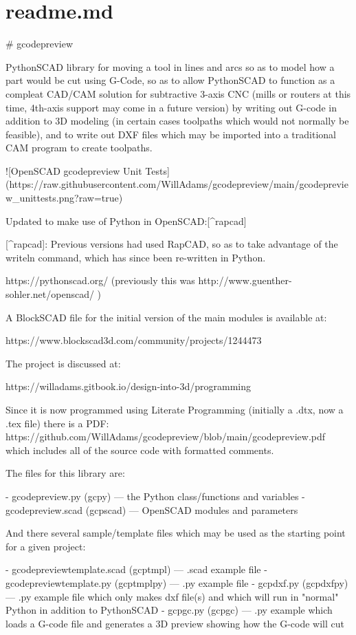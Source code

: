 \documentclass{ltxdoc}
\begin{document}
\clearpage
\section{readme.md}

\begin{readme}
# gcodepreview

PythonSCAD library for moving a tool in lines and arcs so as to model how a part would be cut using G-Code, so as to allow PythonSCAD to function as a compleat CAD/CAM solution for subtractive 3-axis CNC (mills or routers at this time, 4th-axis support may come in a future version) by writing out G-code in addition to 3D modeling (in certain cases toolpaths which would not normally be feasible), and to write out DXF files which may be imported into a traditional CAM program to create toolpaths. 

![OpenSCAD gcodepreview Unit Tests](https://raw.githubusercontent.com/WillAdams/gcodepreview/main/gcodepreview_unittests.png?raw=true)

Updated to make use of Python in OpenSCAD:[^rapcad]

[^rapcad]: Previous versions had used RapCAD, so as to take advantage of the writeln command, which has since been re-written in Python.

https://pythonscad.org/ (previously this was http://www.guenther-sohler.net/openscad/ )

A BlockSCAD file for the initial version of the 
main modules is available at:

https://www.blockscad3d.com/community/projects/1244473

The project is discussed at:

https://willadams.gitbook.io/design-into-3d/programming

Since it is now programmed using Literate Programming (initially a .dtx, now a .tex file) there is a PDF: https://github.com/WillAdams/gcodepreview/blob/main/gcodepreview.pdf which includes all of the source code with formatted comments.

The files for this library are:

 - gcodepreview.py (gcpy) --- the Python class/functions and variables
 - gcodepreview.scad (gcpscad) --- OpenSCAD modules and parameters

And there several sample/template files which may be used as the starting point for a given project:

 - gcodepreviewtemplate.scad (gcptmpl) --- .scad example file
 - gcodepreviewtemplate.py (gcptmplpy) --- .py example file 
 - gcpdxf.py (gcpdxfpy) --- .py example file which only makes dxf file(s) and which will run in "normal" Python in addition to PythonSCAD
 - gcpgc.py (gcpgc) --- .py example which loads a G-code file and generates a 3D preview showing how the G-code will cut


\end{readme}
\end{document}
